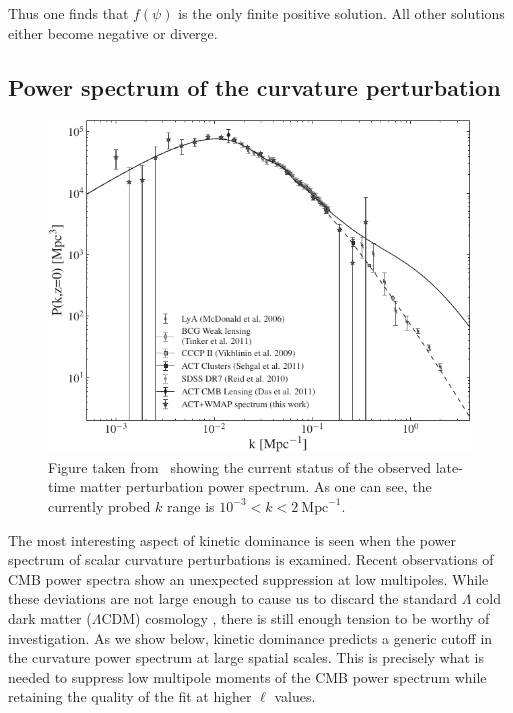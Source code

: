 Thus one finds that \(f(\psi)\) is the only finite positive solution.  All other solutions either become negative or diverge.




\subsection{Power spectrum of the curvature perturbation}
\label{sec:powspec}
%
\begin{figure}[tp]
  \centering
  \includegraphics[width=\textwidth]{chapters/kinetic_dominance/figures/powerspec}
  \caption{Figure taken from~\protect\cite{hlozek_atacama_2012} showing the current status of the observed late-time matter perturbation power spectrum. As one can see, the currently probed \(k\) range is \(10^{-3}<k<2\:\mathrm{Mpc}^{-1}\).}\label{fig:experimental_power_spectrum}
\end{figure}
%

The most interesting aspect of kinetic dominance is seen when the power spectrum of scalar curvature perturbations is examined. Recent observations of CMB power spectra \citep{hinshaw_nine-year_2012,planck_collaboration_planck_2013} show an unexpected suppression at low multipoles. While these deviations are not large enough to cause us to discard the standard \(\Lambda\) cold dark matter (\(\Lambda\)CDM) cosmology \citep{1998PhRvD..57.2207B,2000PhRvD..62l3513B,2004PhRvD..69f3516D}, there is still enough tension to be worthy of investigation.  As we show below, kinetic dominance predicts a generic cutoff in the curvature power spectrum at large spatial scales. This is precisely what is needed to suppress low multipole moments of the CMB power spectrum while retaining the quality of the fit at higher \(\ell\) values.


